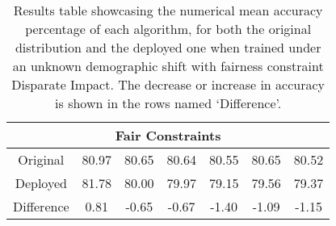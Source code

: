\begin{table}[ht]
\begin{tabular}{|c|cccccc|}
\multicolumn{7}{|c|}{Fair Constraints} \\ \hline
Original & 80.97 & 80.65 & 80.64 & 80.55 & 80.65 & 80.52 \\ \hline
Deployed & 81.78 & 80.00 & 79.97 & 79.15 & 79.56 & 79.37 \\ \hline 
Difference & 0.81 & -0.65 & -0.67 & -1.40 & -1.09 & -1.15 \\ \hline

\end{tabular}
\caption{Results table showcasing the numerical mean accuracy percentage of each algorithm, for both the original distribution and the deployed one when trained under an unknown demographic shift with fairness constraint Disparate Impact. The decrease or increase in accuracy is shown in the rows named `Difference'.}
\label{tab:uci_num_unk_DI}
\end{table}